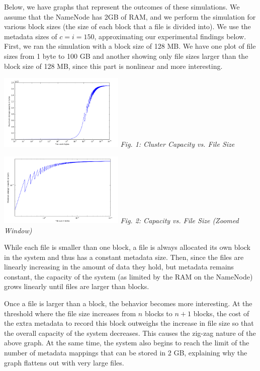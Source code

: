 \documentclass[11pt, a4paper]{article}
\begin{document}
\begin{multicols*}{2}
Below, we have graphs that represent the outcomes of these simulations. We assume that the NameNode has 2GB of RAM, and we perform the simulation for various block sizes (the size of each block that a file is divided into). We use the metadata sizes of $c = i = 150$, approximating our experimental findings below. First, we ran the simulation with a block size of 128 MB. We have one plot of file sizes from 1 byte to 100 GB and another showing only file sizes larger than the block size of 128 MB, since this part is nonlinear and more interesting. 
\begin{center}
	\includegraphics[keepaspectratio=true, width=0.45\textwidth]{logScale}
	\textit{Fig. 1: Cluster Capacity vs. File Size}
\end{center}

\begin{center}
	\includegraphics[keepaspectratio=true, width=0.45\textwidth]{logLogScale}
	\textit{Fig. 2: Capacity vs. File Size (Zoomed Window)}	
\end{center}

While each file is smaller than one block, a file is always allocated its own block in the system and thus has a constant metadata size. Then, since the files are linearly increasing in the amount of data they hold, but metadata remains constant, the capacity of the system (as limited by the RAM on the NameNode) grows linearly until files are larger than blocks. 

Once a file is larger than a block, the behavior becomes more interesting. At the threshold where the file size increases from $n$ blocks to $n+1$ blocks, the cost of the extra metadata to record this block outweighs the increase in file size so that the overall capacity of the system decreases. This causes the zig-zag nature of the above graph. At the same time, the system also begins to reach the limit of the number of metadata mappings that can be stored in 2 GB, explaining why the graph flattens out with very large files. 


\end{multicols*}
\end{document}
